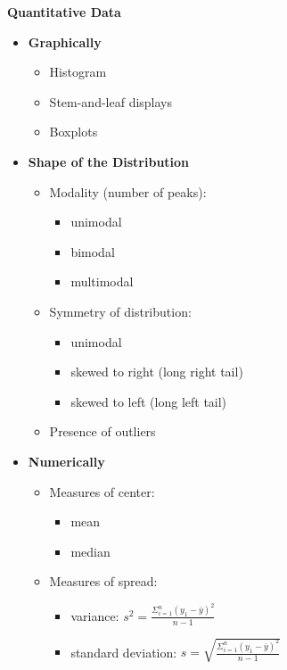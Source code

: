 \documentclass{article}
\begin{document}
\noindent
\textbf{Quantitative Data}
\begin{itemize}
    \item \textbf{Graphically}
    \begin{itemize}
        \item Histogram
        \item Stem-and-leaf displays
        \item Boxplots
    \end{itemize}
    \item \textbf{Shape of the Distribution}
    \begin{itemize}
        \item Modality (number of peaks):
        \begin{itemize}
            \item unimodal
            \item bimodal
            \item multimodal
        \end{itemize}
        \item Symmetry of distribution:
        \begin{itemize}
            \item unimodal
            \item skewed to right (long right tail)
            \item skewed to left (long left tail)
        \end{itemize}
        \item Presence of outliers 
    \end{itemize}
    \item \textbf{Numerically}
    \begin{itemize}
        \item Measures of center: 
        \begin{itemize}
            \item mean
            \item median
        \end{itemize}
        \item Measures of spread: 
        \begin{itemize}
            \item variance: \begin{math}s^2 = \frac{\Sigma_{i=1}^{n}(y_1 - \overline{y})^2}{n-1}\end{math}
            \item standard deviation: \begin{math}s = \sqrt{\frac{\Sigma_{i=1}^{n}(y_1 -\overline{y})^2}{n-1}}\end{math}

\end{itemize}
\end{itemize}
\end{itemize}
\end{document}
